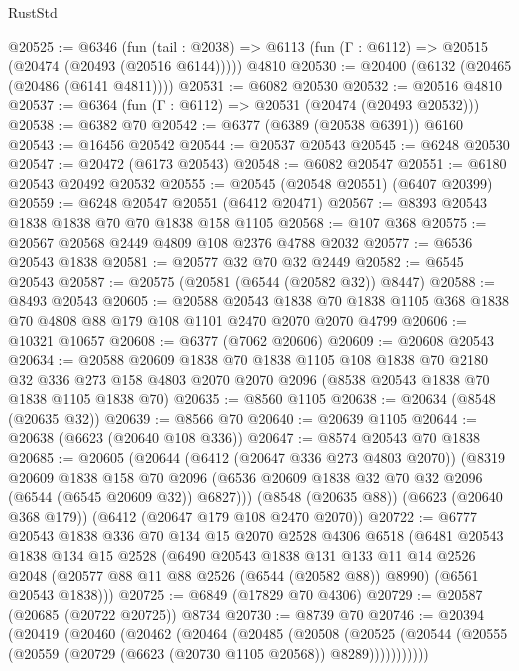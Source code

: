 \begin{lexlean}{RustStd}
\begin{coremodule}
@20525 := @6346
    (fun (tail : @2038) => @6113 (fun (Γ : @6112) => @20515 (@20474 (@20493 (@20516 @6144)))))
    @4810
@20530 := @20400 (@6132 (@20465 (@20486 (@6141 @4811))))
@20531 := @6082 @20530
@20532 := @20516 @4810
@20537 := @6364 (fun (Γ : @6112) => @20531 (@20474 (@20493 @20532)))
@20538 := @6382 @70
@20542 := @6377 (@6389 (@20538 @6391)) @6160
@20543 := @16456 @20542
@20544 := @20537 @20543
@20545 := @6248 @20530
@20547 := @20472 (@6173 @20543)
@20548 := @6082 @20547
@20551 := @6180 @20543 @20492 @20532
@20555 := @20545 (@20548 @20551) (@6407 @20399)
@20559 := @6248 @20547 @20551 (@6412 @20471)
@20567 := @8393 @20543 @1838 @1838 @70 @70 @1838 @158 @1105
@20568 := @107 @368
@20575 := @20567 @20568 @2449 @4809 @108 @2376 @4788 @2032
@20577 := @6536 @20543 @1838
@20581 := @20577 @32 @70 @32 @2449
@20582 := @6545 @20543
@20587 := @20575 (@20581 (@6544 (@20582 @32)) @8447)
@20588 := @8493 @20543
@20605 := @20588
    @20543
    @1838
    @70
    @1838
    @1105
    @368
    @1838
    @70
    @4808
    @88
    @179
    @108
    @1101
    @2470
    @2070
    @2070
    @4799
@20606 := @10321 @10657
@20608 := @6377 (@7062 @20606)
@20609 := @20608 @20543
@20634 := @20588
    @20609
    @1838
    @70
    @1838
    @1105
    @108
    @1838
    @70
    @2180
    @32
    @336
    @273
    @158
    @4803
    @2070
    @2070
    @2096
    (@8538 @20543 @1838 @70 @1838 @1105 @1838 @70)
@20635 := @8560 @1105
@20638 := @20634 (@8548 (@20635 @32))
@20639 := @8566 @70
@20640 := @20639 @1105
@20644 := @20638 (@6623 (@20640 @108 @336))
@20647 := @8574 @20543 @70 @1838
@20685 := @20605
    (@20644
      (@6412 (@20647 @336 @273 @4803 @2070))
      (@8319
        @20609
        @1838
        @158
        @70
        @2096
        (@6536 @20609 @1838 @32 @70 @32 @2096 (@6544 (@6545 @20609 @32)) @6827)))
    (@8548 (@20635 @88))
    (@6623 (@20640 @368 @179))
    (@6412 (@20647 @179 @108 @2470 @2070))
@20722 := @6777
    @20543
    @1838
    @336
    @70
    @134
    @15
    @2070
    @2528
    @4306
    @6518
    (@6481
      @20543
      @1838
      @134
      @15
      @2528
      (@6490
        @20543
        @1838
        @131
        @133
        @11
        @14
        @2526
        @2048
        (@20577 @88 @11 @88 @2526 (@6544 (@20582 @88)) @8990)
        (@6561 @20543 @1838)))
@20725 := @6849 (@17829 @70 @4306)
@20729 := @20587 (@20685 (@20722 @20725)) @8734
@20730 := @8739 @70
@20746 := @20394
    (@20419
      (@20460
        (@20462
          (@20464
            (@20485
              (@20508
                (@20525
                  (@20544 (@20555 (@20559 (@20729 (@6623 (@20730 @1105 @20568)) @8289)))))))))))

\end{coremodule}
\end{lexlean}
